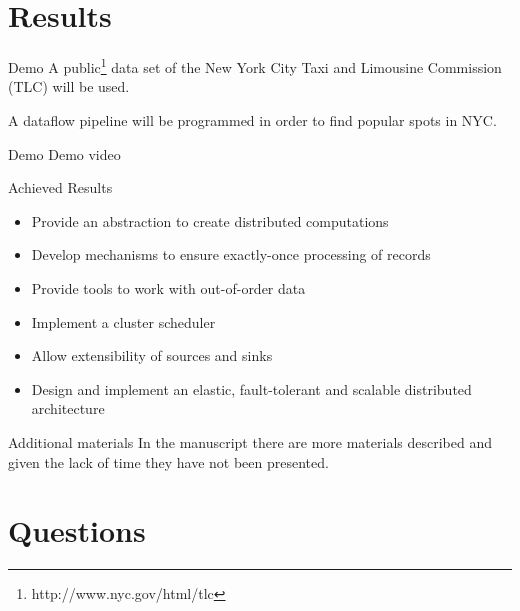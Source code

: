 \documentclass[10pt]{beamer}
\begin{document}
\section{Results}

\begin{frame}[fragile]{Demo}
A public\footnote{http://www.nyc.gov/html/tlc} data set of the New York City
Taxi and Limousine Commission (TLC) will be used.

A dataflow pipeline will be programmed in order to find popular spots in NYC.
\end{frame}


\begin{frame}[fragile]{Demo}
  Demo video
\end{frame}


\begin{frame}[fragile]{Achieved Results}
  \begin{itemize}
    \item Provide an abstraction to create distributed computations
    \item Develop mechanisms to ensure exactly-once processing of records
    \item Provide tools to work with out-of-order data
    \item Implement a cluster scheduler
    \item Allow extensibility of sources and sinks
    \item Design and implement an elastic, fault-tolerant and scalable distributed architecture
  \end{itemize}
\end{frame}

\begin{frame}{Additional materials}
  In the manuscript there are more materials described and given the lack of
  time they have not been presented.
\end{frame}

\section{Questions}



\end{document}
